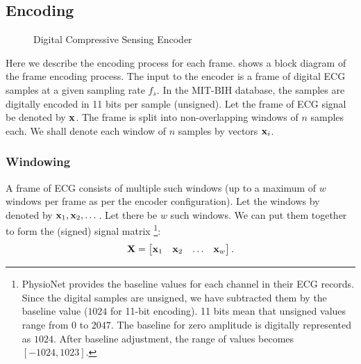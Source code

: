 


\subsection{Encoding}
\begin{figure}[!ht]
\centering 

\caption{Digital Compressive Sensing Encoder}
\label{fig:cs:encoder}
\end{figure}


\begin{figure}[!t]
 \removelatexerror
 \centering

\end{figure}

Here we describe the encoding process for each frame.
 shows a block diagram of the frame encoding process.
The input to the encoder is a frame of digital ECG samples
at a given sampling rate $f_s$. In the MIT-BIH database,
the samples are digitally encoded in 11 bits per sample (unsigned).
Let the frame of ECG signal be denoted by $\mathbf{x}$.
The frame is split into non-overlapping windows of $n$
samples each. We shall denote each window of $n$ samples
by vectors $\mathbf{x}_i$. 

\subsubsection{Windowing}
A frame of ECG consists of multiple
such windows (up to a maximum of $w$ windows per
frame as per the encoder configuration).
Let the windows by denoted by $\mathbf{x}_1, \mathbf{x}_2, \dots$.
Let there be $w$ such windows.
We can put them together to form the (signed) signal matrix
\footnote{
PhysioNet provides the baseline values for each channel
in their ECG records.
Since the digital samples are unsigned, we have subtracted
them by the baseline value ($1024$ for 11-bit encoding).
11 bits mean that unsigned values range from
$0$ to $2047$. The baseline for zero amplitude is
digitally represented as $1024$.
After baseline adjustment, the range of values becomes
$[-1024,1023]$.
}:
\begin{equation}
\mathbf{X} = \begin{bmatrix}
\mathbf{x}_1 & \mathbf{x}_2 & \dots & \mathbf{x}_w
\end{bmatrix}.
\end{equation}

